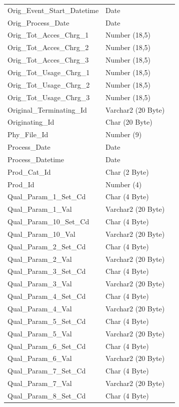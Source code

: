\documentclass[12pt,twoside]{article}
\begin{document}
\begin{longtable}{l|l|l}
Orig\_Event\_Start\_Datetime & Date & \\
Orig\_Process\_Date & Date & \\
Orig\_Tot\_Acces\_Chrg\_1 & Number (18,5) & \\
Orig\_Tot\_Acces\_Chrg\_2 & Number (18,5) & \\
Orig\_Tot\_Acces\_Chrg\_3 & Number (18,5) & \\
Orig\_Tot\_Usage\_Chrg\_1 & Number (18,5) & \\
Orig\_Tot\_Usage\_Chrg\_2 & Number (18,5) & \\
Orig\_Tot\_Usage\_Chrg\_3 & Number (18,5) & \\
Original\_Terminating\_Id & Varchar2 (20 Byte) & \\
Originating\_Id & Char (20 Byte) & \\
Phy\_File\_Id & Number (9) & \\
Process\_Date & Date & \\
Process\_Datetime & Date & \\
Prod\_Cat\_Id & Char (2 Byte) & \\
Prod\_Id & Number (4) & \\
Qual\_Param\_1\_Set\_Cd & Char (4 Byte) & \\
Qual\_Param\_1\_Val & Varchar2 (20 Byte) & \\
Qual\_Param\_10\_Set\_Cd & Char (4 Byte) & \\
Qual\_Param\_10\_Val & Varchar2 (20 Byte) & \\
Qual\_Param\_2\_Set\_Cd & Char (4 Byte) & \\
Qual\_Param\_2\_Val & Varchar2 (20 Byte) & \\
Qual\_Param\_3\_Set\_Cd & Char (4 Byte) & \\
Qual\_Param\_3\_Val & Varchar2 (20 Byte) & \\
Qual\_Param\_4\_Set\_Cd & Char (4 Byte) & \\
Qual\_Param\_4\_Val & Varchar2 (20 Byte) & \\
Qual\_Param\_5\_Set\_Cd & Char (4 Byte) & \\
Qual\_Param\_5\_Val & Varchar2 (20 Byte) & \\
Qual\_Param\_6\_Set\_Cd & Char (4 Byte) & \\
Qual\_Param\_6\_Val & Varchar2 (20 Byte) & \\
Qual\_Param\_7\_Set\_Cd & Char (4 Byte) & \\
Qual\_Param\_7\_Val & Varchar2 (20 Byte) & \\
Qual\_Param\_8\_Set\_Cd & Char (4 Byte) & \\

\end{longtable}
\end{document}
